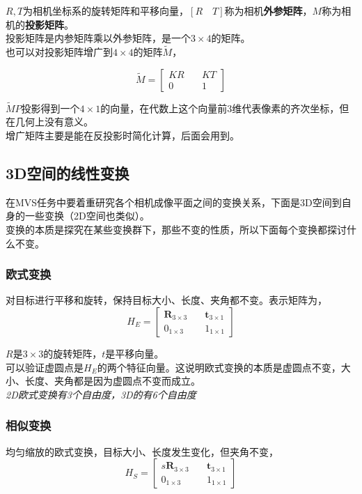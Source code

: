 \documentclass[hpyerref,UTF8,a4paper,titlepage,12pt,oneside]{ctexbook}
\theoremstyle{definition}
\begin{document}
	$R,T$为相机坐标系的旋转矩阵和平移向量，$\left[R\quad T\right]$称为相机\textbf{外参矩阵}，$M$称为相机的\textbf{投影矩阵}。\\

	投影矩阵是内参矩阵乘以外参矩阵，是一个$3\times 4$的矩阵。\\

	也可以对投影矩阵增广到$4\times 4$的矩阵$\tilde{M}$，

	$$
		\tilde{M} = \begin{bmatrix}
			KR\quad& KT\\
			0\quad& 1
		\end{bmatrix}
	$$

	$\tilde{M}P$投影得到一个$4\times 1$的向量，在代数上这个向量前3维代表像素的齐次坐标，但在几何上没有意义。\\

	增广矩阵主要是能在反投影时简化计算，后面会用到。

\subsection{3D空间的线性变换}

	在MVS任务中要着重研究各个相机成像平面之间的变换关系，下面是3D空间到自身的一些变换（2D空间也类似）。\\

	变换的本质是探究在某些变换群下，那些不变的性质，所以下面每个变换都探讨什么不变。

	\subsubsection{欧式变换}
		对目标进行平移和旋转，保持目标大小、长度、夹角都不变。表示矩阵为，
		$$
			H_E = \begin{bmatrix}
				\mathbf{R}_{3\times 3}\quad& \mathbf{t}_{3\times 1}\\
				0_{1\times 3} \quad& 1_{1\times 1}
			\end{bmatrix}
		$$

		$R$是$3\times 3$的旋转矩阵，$t$是平移向量。\\

		可以验证虚圆点是$H_E$的两个特征向量。这说明欧式变换的本质是虚圆点不变，大小、长度、夹角都是因为虚圆点不变而成立。\\

		\textit{2D欧式变换有3个自由度，3D的有6个自由度}

	\subsubsection{相似变换}
		均匀缩放的欧式变换，目标大小、长度发生变化，但夹角不变，
		$$
			H_S = \begin{bmatrix}
				s\mathbf{R}_{3\times 3}\quad& \mathbf{t}_{3\times 1}\\
				0_{1\times 3} \quad& 1_{1\times 1}
			\end{bmatrix}
		$$
\end{document}
